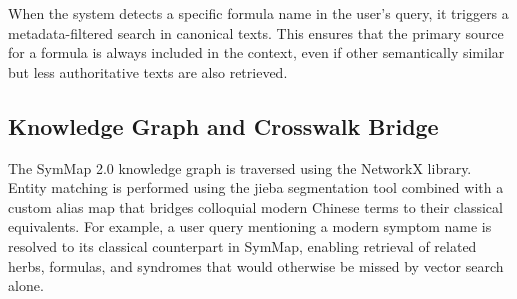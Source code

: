 When the system detects a specific formula name in the user's query, it triggers a metadata-filtered search in canonical texts. This ensures that the primary source for a formula is always included in the context, even if other semantically similar but less authoritative texts are also retrieved.

\subsection{Knowledge Graph and Crosswalk Bridge}

The SymMap 2.0 knowledge graph is traversed using the NetworkX library. Entity matching is performed using the jieba segmentation tool combined with a custom alias map that bridges colloquial modern Chinese terms to their classical equivalents. For example, a user query mentioning a modern symptom name is resolved to its classical counterpart in SymMap, enabling retrieval of related herbs, formulas, and syndromes that would otherwise be missed by vector search alone.

